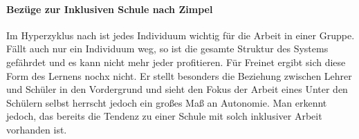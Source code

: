 \paragraph{Bezüge zur Inklusiven Schule nach Zimpel}

Im Hyperzyklus nach \citeauthor{Zimpel2012} ist jedes Individuum wichtig für die Arbeit in einer Gruppe.
Fällt auch nur ein Individuum weg, so ist die gesamte Struktur des Systems gefährdet und es kann nicht mehr jeder profitieren.
Für Freinet ergibt sich diese Form des Lernens nochx nicht.
Er stellt besonders die Beziehung zwischen Lehrer und Schüler in den Vordergrund und sieht den Fokus der Arbeit eines
Unter den Schülern selbst herrscht jedoch ein großes Maß an Autonomie.
Man erkennt jedoch, das bereits die Tendenz zu einer Schule mit solch inklusiver Arbeit vorhanden ist.
